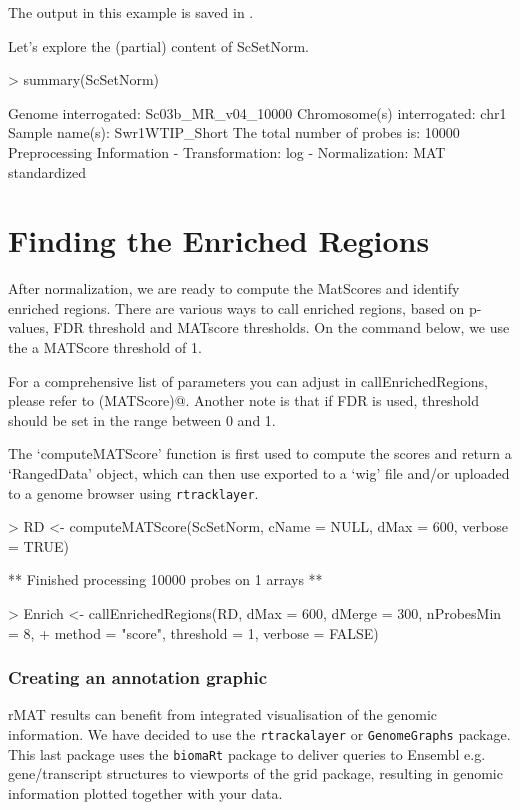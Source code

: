 \documentclass[11pt]{article}
\begin{document}
The output in this example is saved in \verb@ScSetNorm@. 

Let's explore the (partial) content of ScSetNorm.

\begin{Schunk}
\begin{Sinput}
> summary(ScSetNorm)
\end{Sinput}
\begin{Soutput}
   Genome interrogated:  Sc03b_MR_v04_10000  
   Chromosome(s) interrogated: chr1 
   Sample name(s):  Swr1WTIP_Short  
   The total number of probes is:  10000  
   Preprocessing Information 
     - Transformation: log 
     - Normalization: MAT standardized 
\end{Soutput}
\end{Schunk}


\part{Finding the Enriched Regions}
After normalization, we are ready to compute the MatScores and identify enriched regions. There are various ways to call enriched regions, based on p-values, FDR threshold and MATscore thresholds. On the command below, we use the a MATScore threshold of 1.

For a comprehensive list of parameters you can adjust in callEnrichedRegions, please refer to \verb@help(MATScore)@. Another note is that if FDR is used, threshold should be set in the range between 0 and 1.

The `computeMATScore' function is first used to compute the scores and return a `RangedData' object, which can then use exported to a `wig' file and/or uploaded to a genome browser using \texttt{rtracklayer}.

\begin{Schunk}
\begin{Sinput}
> RD <- computeMATScore(ScSetNorm, cName = NULL, dMax = 600, verbose = TRUE)
\end{Sinput}
\begin{Soutput}
** Finished processing  10000  probes on  1  arrays **
\end{Soutput}
\begin{Sinput}
> Enrich <- callEnrichedRegions(RD, dMax = 600, dMerge = 300, nProbesMin = 8, 
+     method = "score", threshold = 1, verbose = FALSE)
\end{Sinput}
\end{Schunk}


\section{Creating an annotation graphic}
rMAT results can benefit from integrated visualisation of the genomic information. We have decided to use the \texttt{rtrackalayer}  or \texttt{GenomeGraphs} package. This last package uses the \texttt{biomaRt} package to deliver queries to Ensembl e.g. gene/transcript structures to viewports of the grid package, resulting in genomic information plotted together with your data. 
\end{document}
